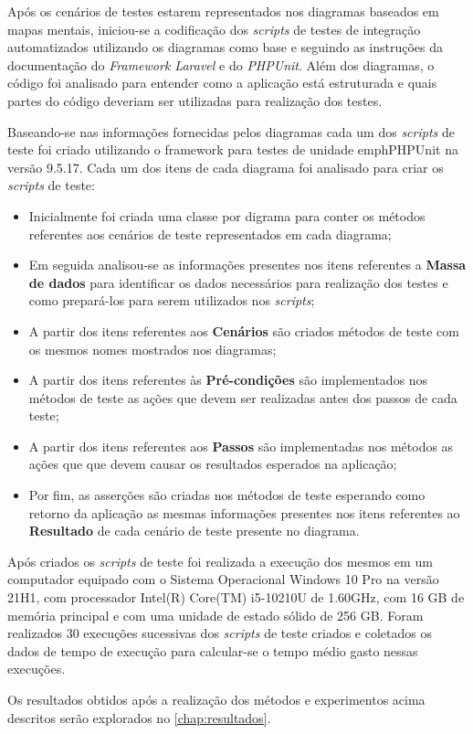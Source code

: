         Após os cenários de testes estarem representados nos diagramas baseados em mapas mentais, iniciou-se a codificação dos \emph{scripts} de testes de integração automatizados utilizando os diagramas como base e seguindo as instruções da documentação do \emph{Framework Laravel} e do \emph{PHPUnit}. Além dos diagramas, o código foi analisado para entender como a aplicação está estruturada e quais partes do código deveriam ser utilizadas para realização dos testes.
        
        Baseando-se nas informações fornecidas pelos diagramas cada um dos \emph{scripts} de teste foi criado utilizando o framework para testes de unidade emph{PHPUnit} na versão 9.5.17. Cada um dos itens de cada diagrama foi analisado para criar os \emph{scripts} de teste:
        
        \begin{itemize}
            \item Inicialmente foi criada uma classe por digrama para conter os métodos referentes aos cenários de teste representados em cada diagrama;
            \item Em seguida analisou-se as informações presentes nos itens referentes a \textbf{Massa de dados} para identificar os dados necessários para realização dos testes e como prepará-los para serem utilizados nos \emph{scripts};
            \item A partir dos itens referentes aos \textbf{Cenários} são criados métodos de teste com os mesmos nomes mostrados nos diagramas;
            \item A partir dos itens referentes às \textbf{Pré-condições} são implementados nos métodos de teste as ações que devem ser realizadas antes dos passos de cada teste;
            \item A partir dos itens referentes aos \textbf{Passos} são implementadas nos métodos as ações que que devem causar os resultados esperados na aplicação;
            \item Por fim, as asserções são criadas nos métodos de teste esperando como retorno da aplicação as mesmas informações presentes nos itens referentes ao \textbf{Resultado} de cada cenário de teste presente no diagrama.
        \end{itemize}
        
        Após criados os \emph{scripts} de teste foi realizada a execução dos mesmos em um computador equipado com o Sistema Operacional Windows 10 Pro na versão 21H1, com processador Intel(R) Core(TM) i5-10210U de 1.60GHz, com 16 GB de memória principal e com uma unidade de estado sólido de 256 GB. Foram realizados 30 execuções sucessivas dos \emph{scripts} de teste criados e coletados os dados de tempo de execução para calcular-se o tempo médio gasto nessas execuções.
        
        Os resultados obtidos após a realização dos métodos e experimentos acima descritos serão explorados no \autoref{chap:resultados}. 